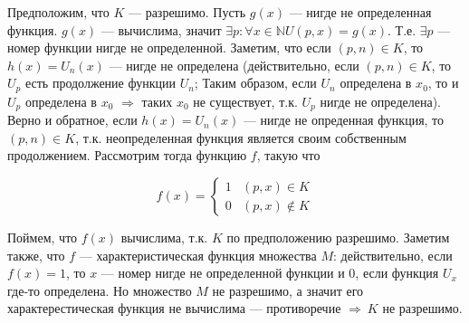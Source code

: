\documentclass{article}
\newcommand{\N}{\mathbb{N}}
\begin{document}
        Предположим, что $K$ --- разрешимо. 
        Пусть $g(x)$ --- нигде не определенная функция. $g(x)$ --- вычислима, значит $\exists p: \forall x \in \N U(p, x) = g(x)$. Т.е. $\exists p$ --- номер функции нигде не определенной. Заметим, что если $(p, n) \in K$, то $h(x) = U_n(x)$ --- нигде не определена (действительно, если $(p, n) \in K$, то $U_p$ есть продолжение функции $U_n$; Таким образом, если $U_n$ определена в $x_0$, то и $U_p$ определена в $x_0$ $\Rightarrow$ таких $x_0$ не существует, т.к. $U_p$ нигде не определена). Верно и обратное, если $h(x) = U_n(x)$ --- нигде не опреденная функция, то $(p, n) \in K$, т.к. неопределенная функция является своим собственным продолжением. Рассмотрим тогда функцию $f$, такую что

            \begin{equation*}
              f(x) = 
              \begin{cases} 
                1 &\text{$(p, x) \in K$}\\
                0 &\text{$(p, x) \notin K$}
              \end{cases}
            \end{equation*} 

        Поймем, что $f(x)$ вычислима, т.к. $K$ по предположению разрешимо. Заметим также, что $f$ --- характеристическая функция множества $M$: действительно, если $f(x) = 1$, то $x$ --- номер нигде не определенной функции и 0, если функция $U_x$ где-то определена. Но множество $M$ не разрешимо, а значит его характерестическая функция не вычислима --- противоречие $\Rightarrow\ K$ не разрешимо.
\end{document}
